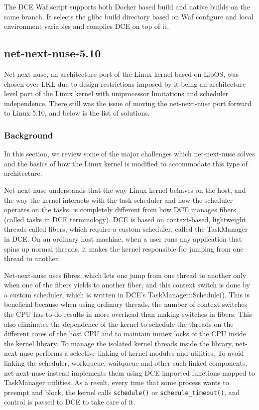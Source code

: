 \documentclass{sig-alternate}
\begin{document}
The DCE Waf script supports both Docker based build and native builds on the same branch. It selects the glibc 
build directory based on Waf configure and local environment variables and compiles DCE on top of it.

\subsection{net-next-nuse-5.10}
Net-next-nuse, an architecture port of the Linux kernel based on LibOS, was chosen over LKL due to design restrictions imposed by it being an architecture level port of
the Linux kernel with uniprocessor limitations and scheduler independence. 
There still was the issue of moving the net-next-nuse port forward to Linux 5.10, and below is the list of solutions.

\subsubsection{Background}
In this section, we review some of the major challenges which net-next-nuse solves and the basics of how the Linux kernel is modified to 
accommodate this type of architecture.

Net-next-nuse understands that the way Linux kernel behaves on the host, and the way the kernel interacts with the task 
scheduler and how the scheduler operates on the tasks, is completely different from how DCE manages fibers (called tasks in DCE terminology). 
DCE is based on context-based, lightweight threads called fibers, which require a custom scheduler, called the TaskManager in DCE. On an ordinary
host machine, when a user runs any application that spins up normal threads, it makes the kernel responsible for jumping from one thread to another. 

Net-next-nuse uses fibres, which lets one jump from one thread to another only when one of the fibers yields to another fiber, and this context switch 
is done by a custom scheduler, which is written in DCE's TaskManager::Schedule(). This is beneficial because when using ordinary threads, 
the number of context switches the CPU has to do
results in more overhead than making switches in fibers. This also eliminates the dependence of the kernel to schedule the threads on 
the different cores of the host CPU and to maintain mutex locks of the CPU inside the kernel library. To manage the isolated kernel threads inside the library, 
net-next-nuse  performs a selective linking of 
kernel modules and utilities. To avoid linking the scheduler, workqueue, waitqueue and other such linked components, net-next-nuse instead implements
them using DCE imported functions mapped to TaskManager utilities. As a result, every time that some process wants to preempt and block, the kernel calls 
\texttt{schedule()} or \texttt{schedule\_timeout()}, and control is passed to DCE to take care of it. 
\end{document}
